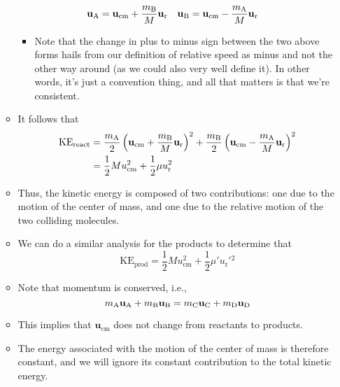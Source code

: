 \documentclass[../notes.tex]{subfiles}
\begin{document}
\begin{itemize}
\begin{itemize}
        \begin{align*}
            \mathbf{u}_{\ce{A}} &= \mathbf{u}_\text{cm}+\frac{m_{\ce{B}}}{M}\mathbf{u}_\text{r}&
            \mathbf{u}_{\ce{B}} &= \mathbf{u}_\text{cm}-\frac{m_{\ce{A}}}{M}\mathbf{u}_\text{r}
        \end{align*}
        \begin{itemize}
            \item Note that the change in plus to minus sign between the two above forms hails from our definition of relative speed as  minus  and not the other way around (as we could also very well define it). In other words, it's just a convention thing, and all that matters is that we're consistent.
        \end{itemize}
        \item It follows that
        \begin{align*}
            \text{KE}_\text{react} &= \frac{m_{\ce{A}}}{2}\left( \mathbf{u}_\text{cm}+\frac{m_{\ce{B}}}{M}\mathbf{u}_\text{r} \right)^2+\frac{m_{\ce{B}}}{2}\left( \mathbf{u}_\text{cm}-\frac{m_{\ce{A}}}{M}\mathbf{u}_\text{r} \right)^2\\
            &= \frac{1}{2}Mu_\text{cm}^2+\frac{1}{2}\mu u_\text{r}^2
        \end{align*}
        \item Thus, the kinetic energy is composed of two contributions: one due to the motion of the center of mass, and one due to the relative motion of the two colliding molecules.
        \item We can do a similar analysis for the products to determine that
        \begin{equation*}
            \text{KE}_\text{prod} = \frac{1}{2}Mu_\text{cm}^2+\frac{1}{2}\mu'u_\text{r}'{}^2
        \end{equation*}
        \item Note that momentum is conserved, i.e.,
        \begin{equation*}
            m_{\ce{A}}\mathbf{u}_{\ce{A}}+m_{\ce{B}}\mathbf{u}_{\ce{B}} = m_{\ce{C}}\mathbf{u}_{\ce{C}}+m_{\ce{D}}\mathbf{u}_{\ce{D}}
        \end{equation*}
        \item This implies that $\mathbf{u}_\text{cm}$ does not change from reactants to products.
        \item The energy associated with the motion of the center of mass is therefore constant, and we will ignore its constant contribution to the total kinetic energy.

\end{itemize}
\end{itemize}
\end{document}
